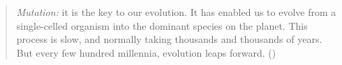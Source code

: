 \begin{quote}
\emph{Mutation:} it is the key to our evolution. It has enabled us to evolve
from a single-celled organism into the dominant species on the planet. This
process is slow, and normally taking thousands and thousands of years. But
every few hundred millennia, evolution leaps forward. (\cite{singer2000})
\end{quote}
